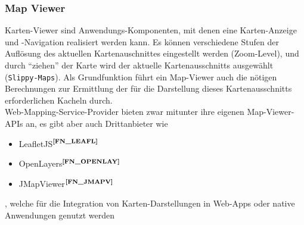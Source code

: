\subsubsection{Map Viewer}\label{MAPVIEWER}
Karten-Viewer sind Anwendungs-Komponenten, mit denen eine Karten-Anzeige und -Navigation realisiert werden kann. Es können verschiedene Stufen der Auflösung des aktuellen Kartenauschnittes eingestellt werden (Zoom-Level), und durch "`ziehen"' der Karte wird der aktuelle Kartenausschnitts ausgewählt (\texttt{Slippy-Maps}). Als Grundfunktion führt ein Map-Viewer auch die nötigen Berechnungen zur Ermittlung der für die Darstellung dieses Kartenausschnitts erforderlichen Kacheln durch.\\
Web-Mapping-Service-Provider bieten zwar mitunter ihre eigenen Map-Viewer-APIs an, es gibt aber auch
Drittanbieter wie 
\begin{itemize}
  \item LeafletJS$^{\textbf{\ref{FN_LEAFL}}}$
\addtocounter{footnote}{1}%
  \item OpenLayers$^{\textbf{\ref{FN_OPENLAY}}}$
\addtocounter{footnote}{1}%
  \item JMapViewer{$^{\textbf{\ref{FN_JMAPV}}}$}
\addtocounter{footnote}{1}%
\end{itemize}
, welche für die Integration von Karten-Darstellungen in Web-Apps oder native Anwendungen genutzt werden


%
%




